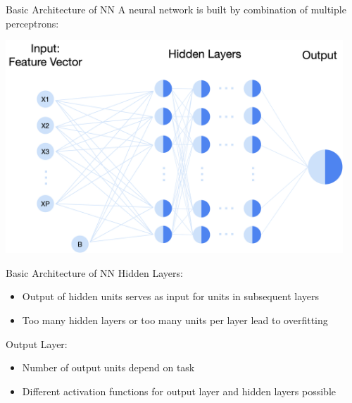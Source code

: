 \documentclass[11pt,compress,t,notes=noshow, xcolor=table]{beamer}
\begin{document}
\begin{vbframe}{Basic Architecture of NN}
\small A neural network is built by combination of multiple perceptrons:

\vspace{0.5cm}
\includegraphics[width = 0.95\textwidth]{slides/neural-networks/figure_man/nutshell-nn-basic-architecture.png}    
\end{vbframe}

\begin{vbframe}{Basic Architecture of NN}
Hidden Layers: 
     \begin{itemize}
         \item  Output of hidden units serves as input for units in subsequent layers
         \item Too many hidden layers or too many units per layer lead to overfitting
     \end{itemize}
Output Layer:
    \begin{itemize}
        \item Number of output units depend on task
        \item Different activation functions for output layer and hidden layers possible
    \end{itemize}

\end{vbframe}
\end{document}

